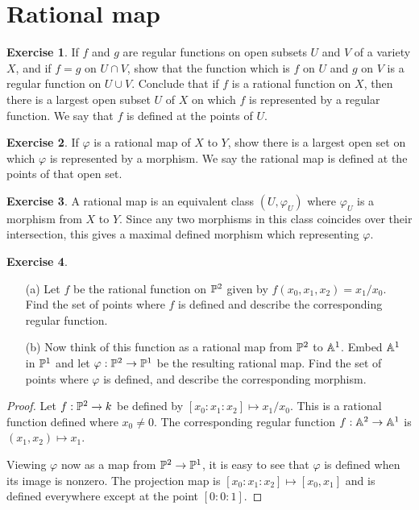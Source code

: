 \documentclass[11pt]{book}
\theoremstyle{definition}
\newtheorem{exercise}{Exercise}[section]
\begin{document}
\section{Rational map}
\begin{exercise}
If $f$ and $g$ are regular functions on open subsets $U$ and $V$ of a variety $X$, and if $f=g$ on $U\cap V$, show that the function which is $f$ on $U$ and $g$ on $V$ is a regular function on $U\cup V$. Conclude that if $f$ is a rational function on $X$, then there is a largest open subset $U$ of $X$ on which $f$ is represented by a regular function. We say that $f$ is defined at the points of $U$.
\end{exercise}
\begin{exercise}
If $\varphi$ is a rational map of $X$ to $Y$, show there is a largest open set on which $\varphi$ is represented by a morphism. We say the rational map is defined at the points of that open set.
\end{exercise}
\begin{exercise}
A rational map is an equivalent class $(U,\varphi_U)$ where $\varphi_U$ is a morphism from $X$ to $Y$. Since any two morphisms in this class coincides over their intersection, this gives a maximal defined morphism which representing $\varphi$.
\end{exercise}
\begin{exercise}
\mbox{}
\begin{itemize}
\item[(a)] Let $f$ be the rational function on $\P^2$ given by $f(x_0,x_1,x_2)=x_1/x_0$. Find the set of points where $f$ is defined and describe the corresponding regular function.
\item[(b)] Now think of this function as a rational map from $\P^2$ to $\A^1$. Embed $\A^1$ in $\P^1$ and let $\varphi:\P^2\to\P^1$ be the resulting rational map. Find the set of points where $\varphi$ is defined, and describe the corresponding morphism.
\end{itemize}
\end{exercise}
\begin{proof}
Let $f:\P^2\to k$ be defined by $[x_0:x_1:x_2]\mapsto x_1/x_0$. This is a rational function defined where $x_0\neq 0$. The corresponding regular function $f:\A^2\to\A^1$ is $(x_1,x_2)\mapsto x_1$.\par
Viewing $\varphi$ now as a map from $\P^2\to\P^1$, it is easy to see that $\varphi$ is defined when its image is nonzero. The projection map is $[x_0:x_1:x_2]\mapsto[x_0,x_1]$ and is defined everywhere except at the point $[0:0:1]$.
\end{proof}
\end{document}
